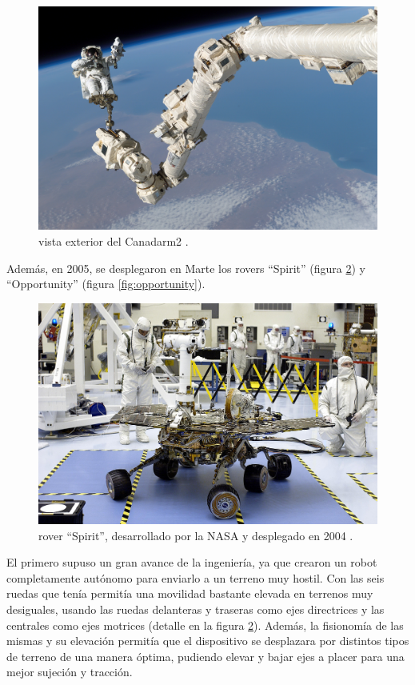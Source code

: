 \begin{figure}[H]
    \centering
    \includegraphics[width=.63\linewidth]{pictures/STS-114_Steve_Robinson_on_Canadarm2.jpg}
    \caption{vista exterior del Canadarm2 \cite{noauthor_mobile_2020}.}
    \label{fig:canadarm2}
\end{figure}

Además, en 2005, se desplegaron en Marte los rovers ``Spirit'' (figura \ref{fig:spirit}) y 
``Opportunity'' (figura \ref{fig:opportunity}). 

\begin{figure}
    \centering
    \includegraphics[width=.75\linewidth]{pictures/spirit_rover.jpg}
    \caption{rover ``Spirit'', desarrollado por la NASA y desplegado en 2004 \cite{noauthor_spirit_2020}.}
    \label{fig:spirit}
\end{figure}

El primero supuso un gran avance de la
ingeniería, ya que crearon un robot completamente autónomo para enviarlo a un terreno
muy hostil. Con las seis ruedas que tenía permitía una movilidad bastante elevada en
terrenos muy desiguales, usando las ruedas delanteras y traseras como ejes directrices 
y las centrales como ejes motrices (detalle en la figura \ref{fig:spirit}). Además,
la fisionomía de las mismas y su elevación permitía que el dispositivo se desplazara por
distintos tipos de terreno de una manera óptima, pudiendo elevar y bajar ejes a placer
para una mejor sujeción y tracción.

